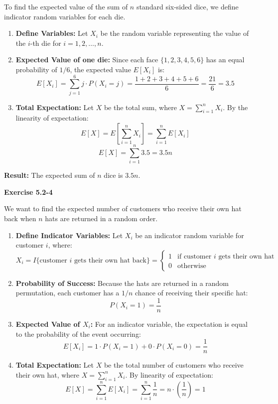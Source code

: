 \documentclass{article}
\theoremstyle{theorem}
\theoremstyle{definition}
\theoremstyle{remark}
\begin{document}
To find the expected value of the sum of $n$ standard six-sided dice, we define indicator random variables for each die.

\begin{enumerate}
    \item \textbf{Define Variables:} Let $X_i$ be the random variable representing the value of the $i$-th die for $i = 1, 2, \dots, n$.
    \item \textbf{Expected Value of one die:} Since each face $\{1, 2, 3, 4, 5, 6\}$ has an equal probability of $1/6$, the expected value $E[X_i]$ is:
    \[
    E[X_i] = \sum_{j=1}^{6} j \cdot P(X_i = j) = \frac{1+2+3+4+5+6}{6} = \frac{21}{6} = 3.5
    \]
    \item \textbf{Total Expectation:} Let $X$ be the total sum, where $X = \sum_{i=1}^{n} X_i$. By the linearity of expectation:
    \[
    E[X] = E\left[\sum_{i=1}^{n} X_i\right] = \sum_{i=1}^{n} E[X_i]
    \]
    \[
    E[X] = \sum_{i=1}^{n} 3.5 = 3.5n
    \]
\end{enumerate}

\textbf{Result:} The expected sum of $n$ dice is $3.5n$.

\textbf{Exercise 5.2-4}

We want to find the expected number of customers who receive their own hat back when $n$ hats are returned in a random order.

\begin{enumerate}
    \item \textbf{Define Indicator Variables:} Let $X_i$ be an indicator random variable for customer $i$, where:
    \[
    X_i = I\{\text{customer } i \text{ gets their own hat back}\} = 
    \begin{cases} 
    1 & \text{if customer } i \text{ gets their own hat} \\
    0 & \text{otherwise}
    \end{cases}
    \]
    \item \textbf{Probability of Success:} Because the hats are returned in a random permutation, each customer has a $1/n$ chance of receiving their specific hat:
    \[
    P(X_i = 1) = \frac{1}{n}
    \]
    \item \textbf{Expected Value of $X_i$:} For an indicator variable, the expectation is equal to the probability of the event occurring:
    \[
    E[X_i] = 1 \cdot P(X_i = 1) + 0 \cdot P(X_i = 0) = \frac{1}{n}
    \]
    \item \textbf{Total Expectation:} Let $X$ be the total number of customers who receive their own hat, where $X = \sum_{i=1}^{n} X_i$. By linearity of expectation:
    \[
    E[X] = \sum_{i=1}^{n} E[X_i] = \sum_{i=1}^{n} \frac{1}{n} = n \cdot \left(\frac{1}{n}\right) = 1
    \]
\end{enumerate}
\end{document}
